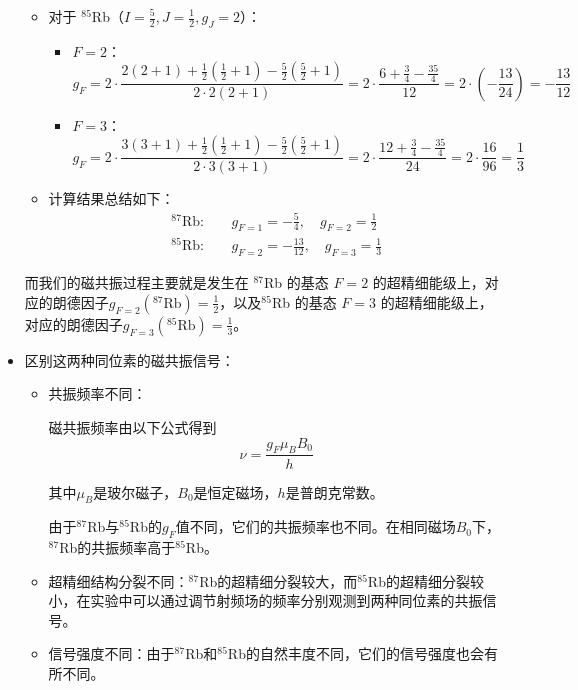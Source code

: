 \begin{itemize}
\begin{itemize}
                \item 对于 $^{85}$Rb（$I = \frac{5}{2}, J = \frac{1}{2}, g_J = 2$）：
                    \begin{itemize}
                        \item $F = 2$：
                        \[
                        g_F = 2 \cdot \frac{2(2+1) + \frac{1}{2}(\frac{1}{2}+1) - \frac{5}{2}(\frac{5}{2}+1)}{2 \cdot 2(2+1)} = 2 \cdot \frac{6 + \frac{3}{4} - \frac{35}{4}}{12} = 2 \cdot \left( -\frac{13}{24} \right) = -\frac{13}{12}
                        \]
                        \item $F = 3$：
                        \[
                        g_F = 2 \cdot \frac{3(3+1) + \frac{1}{2}(\frac{1}{2}+1) - \frac{5}{2}(\frac{5}{2}+1)}{2 \cdot 3(3+1)} = 2 \cdot \frac{12 + \frac{3}{4} - \frac{35}{4}}{24} = 2 \cdot \frac{16}{96} = \frac{1}{3}
                        \]
                    \end{itemize}

                \item 计算结果总结如下：
                    \[
                    \begin{aligned}
                    ^{87}\mathrm{Rb}: \quad & g_{F=1} = -\frac{5}{4}, \quad g_{F=2} = \frac{1}{2} \\
                    ^{85}\mathrm{Rb}: \quad & g_{F=2} = -\frac{13}{12}, \quad g_{F=3} = \frac{1}{3}
                    \end{aligned}
                    \]
            \end{itemize}


            而我们的磁共振过程主要就是发生在 $^{87}$Rb 的基态 $F = 2$ 的超精细能级上，对应的朗德因子$g_{F = 2}(^{87}\text{Rb}) = \frac{1}{2}$，以及$^{85}$Rb 的基态 $F = 3$ 的超精细能级上，对应的朗德因子$g_{F = 3}(^{85}\text{Rb}) = \frac{1}{3}$。

        \item 区别这两种同位素的磁共振信号：
            \begin{itemize}
                \item 共振频率不同：

                    磁共振频率由以下公式得到
                    \[
                        \nu=\frac{g_F\mu_B B_0}{h}
                    \]

                    其中\(\mu_B\)是玻尔磁子，\(B_0\)是恒定磁场，\(h\)是普朗克常数。

                    由于\(^{87}\)Rb与\(^{85}\)Rb的\(g_F\)值不同，它们的共振频率也不同。在相同磁场\(B_0\)下，\(^{87}\)Rb的共振频率高于\(^{85}\)Rb。

                \item 超精细结构分裂不同：\(^{87}\)Rb的超精细分裂较大，而\(^{85}\)Rb的超精细分裂较小，在实验中可以通过调节射频场的频率分别观测到两种同位素的共振信号。

                \item 信号强度不同：由于\(^{87}\)Rb和\(^{85}\)Rb的自然丰度不同，它们的信号强度也会有所不同。 
            \end{itemize}

    \end{itemize}



